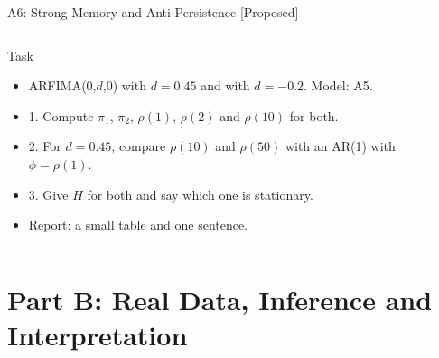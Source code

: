 \begin{frame}{A6: Strong Memory and Anti-Persistence [Proposed]}
\propsub
\itemsize{\scriptsize}
\begin{columns}[T]
\begin{column}{\taskw}
\begin{block}{Task}
\begin{itemize}
    \item ARFIMA(0,$d$,0) with $d = 0.45$ and with $d = -0.2$. Model: A5.
    \item 1. Compute $\pi_1$, $\pi_2$, $\rho(1)$, $\rho(2)$ and $\rho(10)$ for both.
    \item 2. For $d = 0.45$, compare $\rho(10)$ and $\rho(50)$ with an AR(1) with $\phi = \rho(1)$.
    \item 3. Give $H$ for both and say which one is stationary.
    \item Report: a small table and one sentence.
\end{itemize}
\end{block}
\end{column}
\begin{column}{\solw}
\end{column}
\end{columns}
\end{frame}


\section{Part B: Real Data, Inference and Interpretation}

